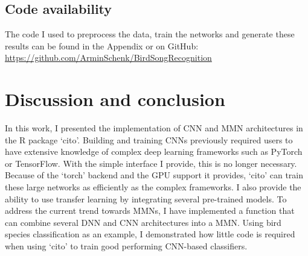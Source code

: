 \documentclass[12pt,twoside]{scrreport}
\newcommand{\pkg}[1]{`#1'}
\begin{document}
\section*{Code availability}
The code I used to preprocess the data, train the networks and generate these results can be found in the Appendix or on GitHub: \url{https://github.com/ArminSchenk/BirdSongRecognition}

\chapter*{Discussion and conclusion}
In this work, I presented the implementation of CNN and MMN architectures in the R package \pkg{cito}. Building and training CNNs previously required users to have extensive knowledge of complex deep learning frameworks such as PyTorch or TensorFlow. With the simple interface I provide, this is no longer necessary. Because of the \pkg{torch} backend and the GPU support it provides, \pkg{cito} can train these large networks as efficiently as the complex frameworks. I also provide the ability to use transfer learning by integrating several pre-trained models. To address the current trend towards MMNs, I have implemented a function that can combine several DNN and CNN architectures into a MMN. Using bird species classification as an example, I demonstrated how little code is required when using \pkg{cito} to train good performing CNN-based classifiers.
\end{document}

